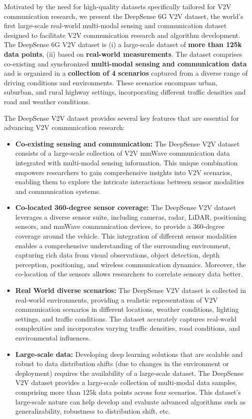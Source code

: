 \documentclass[10pt,comsoc]{IEEEtran}
\begin{document}
Motivated by the need for high-quality datasets specifically tailored for V2V communication research, we present the DeepSense 6G V2V dataset, the world's first large-scale real-world multi-modal sensing and communication dataset designed to facilitate V2V communication research and algorithm development. The DeepSense 6G V2V dataset is (i) a large-scale dataset of \textbf{more than 125k data points}, (ii) based on \textbf{real-world measurements}. The dataset comprises co-existing and synchronized \textbf{multi-modal sensing and communication data} and is organized in a \textbf{collection of 4 scenarios} captured from a diverse range of driving conditions and environments. These scenarios encompass urban, suburban, and rural highway settings, incorporating different traffic densities and road and weather conditions.

The DeepSense V2V dataset provides several key features that are essential for advancing V2V communication research:
\begin{itemize}
	\item \textbf{Co-existing sensing and communication:} The DeepSense V2V dataset consists of a large-scale collection of V2V mmWave communication data integrated with multi-modal sensing information. This unique combination empowers researchers to gain comprehensive insights into V2V scenarios, enabling them to explore the intricate interactions between sensor modalities and communication systems.
	
	\item \textbf{Co-located 360-degree sensor coverage:} The DeepSense V2V dataset leverages a diverse sensor suite, including cameras, radar, LiDAR, positioning sensors, and mmWave communication devices, to provide a $360$-degree coverage around the vehicle. This integration of different sensor modalities enables a comprehensive understanding of the surrounding environment, capturing rich data from visual observations, object detection, depth perception, positioning, and wireless communication dynamics. Moreover, the co-location of the sensors allows researchers to correlate sensory data better. 
	
	\item \textbf{Real World diverse scenarios:} The DeepSense V2V dataset is collected in real-world environments, providing a realistic representation of V2V communication scenarios in different locations, weather conditions, lighting settings, and traffic conditions. The dataset accurately captures real-world complexities and incorporates varying traffic densities, road conditions, and environmental influences.
	
	\item \textbf{Large-scale data:} Developing deep learning solutions that are scalable and robust to data distribution shifts (due to changes in the environment or deployment) requires the availability of a large-scale dataset. The DeepSense V2V dataset provides a large-scale collection of multi-modal data samples, comprising more than $125$k data points across four scenarios. This dataset's large-scale nature can help develop and evaluate advanced algorithms such as generalizability, robustness to distribution shift, etc.
\end{itemize}
\end{document}
